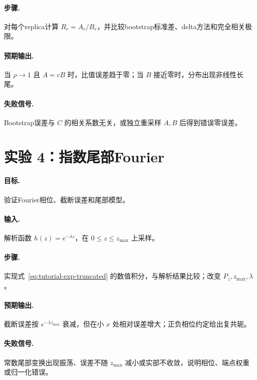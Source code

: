 \documentclass[UTF8,12pt,a4paper,twoside,openany]{ctexbook}
\begin{document}
\paragraph{步骤.} 对每个replica计算 \(R_r=A_r/B_r\)，并比较bootstrap标准差、delta方法和完全相关极限。

\paragraph{预期输出.} 当 \(\rho\to1\) 且 \(A=cB\) 时，比值误差趋于零；当 \(B\) 接近零时，分布出现非线性长尾。

\paragraph{失败信号.} Bootstrap误差与 \(C\) 的相关系数无关，或独立重采样 \(A,B\) 后得到错误零误差。

\section{实验 4：指数尾部Fourier}

\paragraph{目标.} 验证Fourier相位、截断误差和尾部模型。

\paragraph{输入.} 解析函数 \(h(z)=e^{-\lambda z}\)，在 \(0\le z\le z_{\max}\) 上采样。

\paragraph{步骤.} 实现式~\eqref{eq:tutorial-exp-truncated} 的数值积分，与解析结果比较；改变 \(P_z,z_{\max},\lambda\)。

\paragraph{预期输出.} 截断误差按 \(e^{-\lambda z_{\max}}\) 衰减，但在小 \(x\) 处相对误差增大；正负相位约定给出复共轭。

\paragraph{失败信号.} 常数尾部变换出现振荡、误差不随 \(z_{\max}\) 减小或实部不收敛，说明相位、端点权重或归一化错误。
\end{document}
